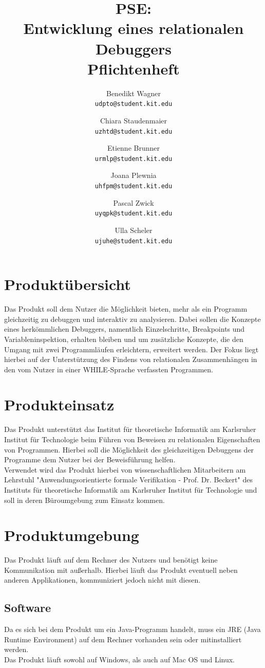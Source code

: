 \documentclass[parskip=full]{scrartcl}
\title{PSE:\\ Entwicklung eines relationalen Debuggers\\ Pflichtenheft}
\author{
	Benedikt Wagner\\
	\texttt{udpto@student.kit.edu}
	\and Chiara Staudenmaier\\
	\texttt{uzhtd@student.kit.edu}
	\and Etienne Brunner\\
	\texttt{urmlp@student.kit.edu}
	\and Joana Plewnia\\
	\texttt{uhfpm@student.kit.edu} 
	\and Pascal Zwick\\
	\texttt{uyqpk@student.kit.edu}
	\and Ulla Scheler\\
	\texttt{ujuhe@student.kit.edu}
}
\begin{document}
\maketitle
\newpage

\tableofcontents
\newpage

\section{Produktübersicht}
Das Produkt soll dem Nutzer die Möglichkeit bieten, mehr als ein Programm gleichzeitig zu debuggen und interaktiv zu analysieren. Dabei sollen die Konzepte eines herkömmlichen Debuggers, namentlich Einzelschritte, Breakpoints und Variableninspektion, erhalten bleiben und um zusätzliche Konzepte, die den Umgang mit zwei Programmläufen erleichtern, erweitert werden. Der Fokus liegt hierbei auf der Unterstützung des Findens von relationalen Zusammenhängen in den vom Nutzer in einer WHILE-Sprache verfassten Programmen.


\section{Produkteinsatz}
Das Produkt unterstützt das Institut für theoretische Informatik am Karlsruher Institut für Technologie beim Führen von Beweisen zu relationalen Eigenschaften von Programmen. Hierbei soll die Möglichkeit des gleichzeitigen Debuggens der Programme dem Nutzer bei der Beweisführung helfen. \\
Verwendet wird das Produkt hierbei von wissenschaftlichen Mitarbeitern am Lehrstuhl "Anwendungsorientierte formale Verifikation - Prof. Dr. Beckert" des Instituts für theoretische Informatik am Karlsruher Institut für Technologie und soll in deren Büroumgebung zum Einsatz kommen.

 

\section{Produktumgebung}
Das Produkt läuft auf dem Rechner des Nutzers und benötigt keine Kommunikation mit außerhalb. Hierbei läuft das Produkt eventuell neben anderen Applikationen, kommuniziert jedoch nicht mit diesen.

\subsection{Software}
Da es sich bei dem Produkt um ein Java-Programm handelt, muss ein JRE (Java Runtime Environment) auf dem Rechner vorhanden sein oder mitinstalliert werden. \\
Das Produkt läuft sowohl auf Windows, als auch auf Mac OS und Linux.
\end{document}
